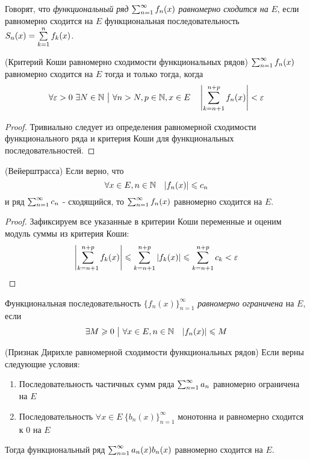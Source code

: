 \begin{definition}
	Говорят, что \textit{функциональный ряд} $\sum_{n = 1}^\infty f_n(x)$ \textit{равномерно сходится на} $E$, если равномерно сходится на $E$ функциональная последовательность $S_n(x) = \sum\limits_{k = 1}^n f_k(x)$.
\end{definition}

\begin{theorem} (Критерий Коши равномерно сходимости функциональных рядов)
	$\sum_{n = 1}^\infty f_n(x)$ равномерно сходится на $E$ тогда и только тогда, когда
	\[
		\forall \varepsilon > 0\ \exists N \in \mathbb{N} \ \big|\  \forall n > N, p \in \mathbb{N}, x \in E \quad \left|\sum\limits_{k = n + 1}^{n + p} f_n(x)\right| < \varepsilon
	\]
\end{theorem}

\begin{proof}
	Тривиально следует из определения равномерной сходимости функционального ряда и критерия Коши для функциональных последовательностей.
\end{proof}

\begin{theorem} (Вейерштрасса)
	Если верно, что
	\[
		\forall x \in E, n \in \mathbb{N} \quad |f_n(x)| \leqslant c_n
	\]
	и ряд $\sum_{n = 1}^\infty c_n$ - сходящийся, то $\sum_{n = 1}^\infty f_n(x)$ равномерно сходится на $E$.
\end{theorem}

\begin{proof}
	Зафиксируем все указанные в критерии Коши переменные и оценим модуль суммы из критерия Коши:
	\[
		\left|\sum\limits_{k = n + 1}^{n + p} f_k(x)\right| \leqslant \sum\limits_{k = n + 1}^{n + p} |f_k(x)| \leqslant \sum\limits_{k = n + 1}^{n + p} c_k < \varepsilon
	\]
\end{proof}

\begin{definition}
	Функциональная последовательность $\{f_n(x)\}_{n = 1}^\infty$ \textit{равномерно ограничена} на $E$, если
	\[
		\exists M \geqslant 0 \ \big|\  \forall x \in E, n \in \mathbb{N} \quad |f_n(x)| \leqslant M
	\]
\end{definition}

\begin{theorem} (Признак Дирихле равномерной сходимости функциональных рядов)
	Если верны следующие условия:
	\begin{enumerate}
		\item Последовательность частичных сумм ряда $\sum_{n = 1}^\infty a_n$ равномерно ограничена на $E$
		
		\item Последовательность $\forall x \in E\ \{b_n(x)\}_{n = 1}^\infty$ монотонна и равномерно сходится к 0 на $E$
	\end{enumerate}
	Тогда функциональный ряд $\sum_{n = 1}^\infty a_n(x)b_n(x)$ равномерно сходится на $E$.
\end{theorem}


